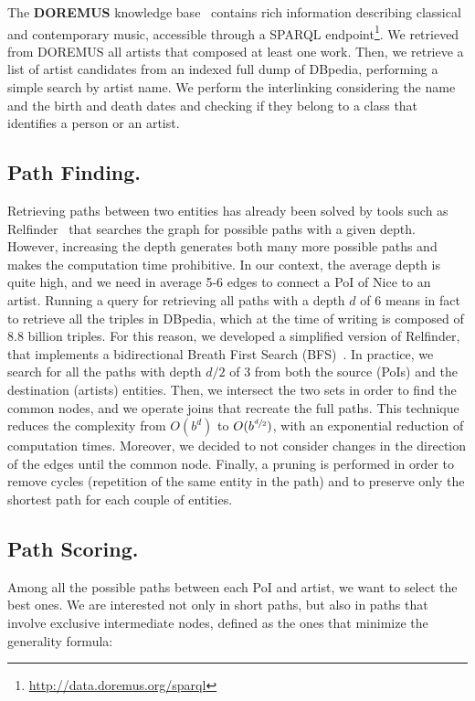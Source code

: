 \documentclass{llncs}
\begin{document}
The \textbf{DOREMUS} knowledge base~\cite{achichi2015doremus} contains rich information describing classical and contemporary music, accessible through a SPARQL endpoint\footnote{\url{http://data.doremus.org/sparql}}. We retrieved from DOREMUS all artists that composed at least one work. Then, we retrieve a list of artist candidates from an indexed full dump of DBpedia, performing a simple search by artist name. We perform the interlinking considering the name and the birth and death dates and checking if they belong to a class that identifies a person or an artist.


\subsection*{Path Finding.}
Retrieving paths between two entities has already been solved by tools such as Relfinder~\cite{heim2009relfinder} that searches the graph for possible paths with a given depth. However, increasing the depth generates both many more possible paths and makes the computation time prohibitive. In our context, the average depth is quite high, and we need in average 5-6 edges to connect a PoI of Nice to an artist. Running a query for retrieving all paths with a depth $d$ of 6 means in fact to retrieve all the triples in DBpedia, which at the time of writing is composed of 8.8 billion triples. For this reason, we developed a simplified version of Relfinder, that implements a bidirectional Breath First Search (BFS)~\cite{russell1995modern}. In practice, we search for all the paths with depth $d/2$ of 3 from both the source (PoIs) and the destination (artists) entities. Then, we intersect the two sets in order to find the common nodes, and we operate joins that recreate the full paths. This technique reduces the complexity from $O(b^d)$ to $O(b^{\sfrac{d}{2}})$, with an exponential reduction of computation times. Moreover, we decided to not consider changes in the direction of the edges until the common node. Finally, a pruning is performed in order to remove cycles (repetition of the same entity in the path) and to preserve only the shortest path for each couple of entities.

\subsection*{Path Scoring.}
Among all the possible paths between each PoI and artist, we want to select the best ones. We are interested not only in short paths, but also in paths that involve exclusive intermediate nodes, defined as the ones that minimize the generality formula:
\end{document}

